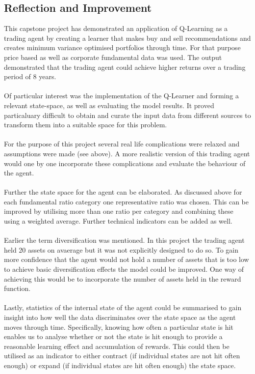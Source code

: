 \documentclass[dvips,12pt]{article}
\begin{document}
\subsection{Reflection and Improvement}
This capstone project has demonstrated an application of Q-Learning as a trading agent by creating a learner that makes buy and sell recommendations and creates minimum variance optimised portfolios through time. For that purpose price based as well as corporate fundamental data was used. The output demonstrated that the trading agent could achieve higher returns over a trading period of 8 years.
\\\\
Of particular interest was the implementation of the Q-Learner and forming a relevant state-space, as well as evaluating the model results. It proved particaluary difficult to obtain and curate the input data from different sources to transform them into a suitable space for this problem.
\\\\
For the purpose of this project several real life complications were relaxed and assumptions were made (see above). 
A more realistic version of this trading agent would one by one incorporate these complications and evaluate the behaviour of the agent. 
\\\\
Further the state space for the agent can be elaborated. As discussed above for each fundamental ratio category one representative ratio was chosen. This can be improved by utilising more than one ratio per category and combining these using a weighted average. Further technical indicators can be added as well.
\\\\
Earlier the term diversification was mentioned. In this project the trading agent held 20 assets on avaerage but it was not explicitly designed to do so. To gain more confidence that the agent would not hold a number of assets that is too low to achieve basic diversification effects the model could be improved. One way of achieving this would be to incorporate the number of assets held in the reward function.
\\\\
Lastly, statistics of the internal state of the agent could be summarised to gain insight into how well the data discriminates over the state space as the agent moves through time. Specifically, knowing how often a particular state is hit enables us to analyse whether or not the state is hit enough to provide a reasonable learning effect and accumulation of rewards. This could then be utilised as an indicator to either contract (if individual states are not hit often enough) or expand (if individual states are hit often enough) the state space.
\end{document}
